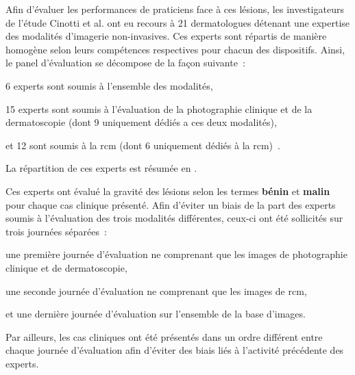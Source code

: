 \addtocounter{footnote}{1}
\addtocounter{footnote}{1}
\addtocounter{footnote}{1}

Afin d'évaluer les performances de praticiens face à ces lésions, les investigateurs de l'étude Cinotti et al. ont eu recours à 21 dermatologues détenant une expertise des modalités d'imagerie non-invasives. Ces experts sont répartis de manière homogène selon leurs compétences respectives pour chacun des dispositifs. Ainsi, le panel d'évaluation se décompose de la façon suivante~:~
\begin{inlinerate}
    \item 6 experts sont soumis à l'ensemble des modalités,
    \item 15 experts sont soumis à l'évaluation de la photographie clinique et de la dermatoscopie (dont 9 uniquement dédiés a ces deux modalités),
    \item et 12 sont soumis à la \gls{rcm} (dont 6 uniquement dédiés à la \gls{rcm})~\cite{Cinotti2018}.
\end{inlinerate}
La répartition de ces experts est résumée en .\par

Ces experts ont évalué la gravité des lésions selon les termes \textbf{bénin} et \textbf{malin} pour chaque cas clinique présenté. Afin d'éviter un biais de la part des experts soumis à l'évaluation des trois modalités différentes, ceux-ci ont été sollicités sur trois journées séparées~:
\begin{inlinerate}
    \item une première journée d'évaluation ne comprenant que les images de photographie clinique et de dermatoscopie,
    \item une seconde journée d'évaluation ne comprenant que les images de \gls{rcm},
    \item et une dernière journée d'évaluation sur l'ensemble de la base d'images.
\end{inlinerate}
Par ailleurs, les cas cliniques ont été présentés dans un ordre différent entre chaque journée d'évaluation afin d'éviter des biais liés à l'activité précédente des experts.\par

